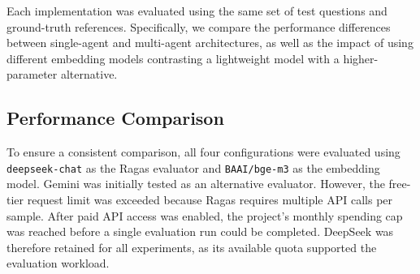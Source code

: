 \documentclass[a4paper,12pt]{report}
\begin{document}
Each implementation was evaluated using the same set of test questions and ground-truth references. Specifically, we compare the performance differences between single-agent and multi-agent architectures, as well as the impact of using different embedding models contrasting a lightweight model with a higher-parameter alternative.

\subsection{Performance Comparison}


\begin{table}[htbp]
    \centering
    \caption{Evaluation results of the four RAG implementations.}
    \label{tab:rag_evaluation}

\end{table}
\begin{sloppypar}
To ensure a consistent comparison, all four configurations were
evaluated using \texttt{deepseek-chat} as the Ragas evaluator and
\texttt{BAAI/bge-m3} as the embedding model. Gemini was initially
tested as an alternative evaluator. However, the free-tier request
limit was exceeded because Ragas requires multiple API calls per
sample. After paid API access was enabled, the project's monthly
spending cap was reached before a single evaluation run could be
completed. DeepSeek was therefore retained for all experiments,
as its available quota supported the evaluation workload.
\end{sloppypar}
\end{document}
